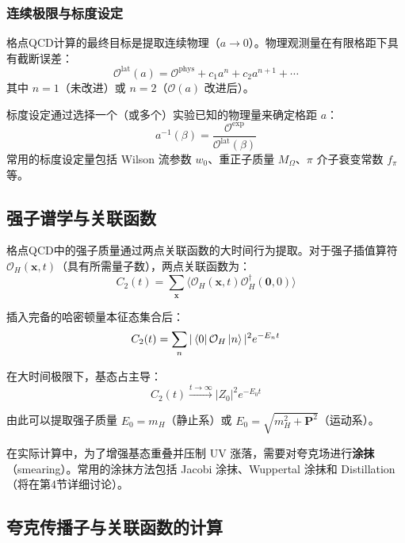 \documentclass[11pt,a4paper]{ctexart}
\newcommand{\order}[1]{\mathcal{O}(#1)}
\begin{document}
\subsubsection{连续极限与标度设定}

格点QCD计算的最终目标是提取连续物理（$a \to 0$）。物理观测量在有限格距下具有截断误差：
\begin{equation}
\mathcal{O}^{\text{lat}}(a) = \mathcal{O}^{\text{phys}} + c_1 a^n + c_2 a^{n+1} + \cdots
\end{equation}
其中 $n=1$（未改进）或 $n=2$（$\order{a}$ 改进后）。

标度设定通过选择一个（或多个）实验已知的物理量来确定格距 $a$：
\begin{equation}
a^{-1}(\beta) = \frac{\mathcal{O}^{\text{exp}}}{\mathcal{O}^{\text{lat}}(\beta)}
\end{equation}
常用的标度设定量包括 Wilson 流参数 $w_0$、重正子质量 $M_\Omega$、$\pi$ 介子衰变常数 $f_\pi$ 等。

\subsection{强子谱学与关联函数}

格点QCD中的强子质量通过两点关联函数的大时间行为提取。对于强子插值算符 $\mathcal{O}_H(\mathbf{x}, t)$（具有所需量子数），两点关联函数为：
\begin{equation}
C_2(t) = \sum_{\mathbf{x}} \langle \mathcal{O}_H(\mathbf{x}, t) \mathcal{O}_H^\dagger(\mathbf{0}, 0) \rangle
\end{equation}

插入完备的哈密顿量本征态集合后：
\begin{equation}
C_2(t) = \sum_n |\bra{0} \mathcal{O}_H \ket{n}|^2 e^{-E_n t}
\end{equation}

在大时间极限下，基态占主导：
\begin{equation}
C_2(t) \xrightarrow{t \to \infty} |Z_0|^2 e^{-E_0 t}
\end{equation}

由此可以提取强子质量 $E_0 = m_H$（静止系）或 $E_0 = \sqrt{m_H^2 + \mathbf{P}^2}$（运动系）。

在实际计算中，为了增强基态重叠并压制 UV 涨落，需要对夸克场进行\textbf{涂抹}（smearing）。常用的涂抹方法包括 Jacobi 涂抹、Wuppertal 涂抹和 Distillation（将在第4节详细讨论）。

\subsection{夸克传播子与关联函数的计算}
\end{document}
